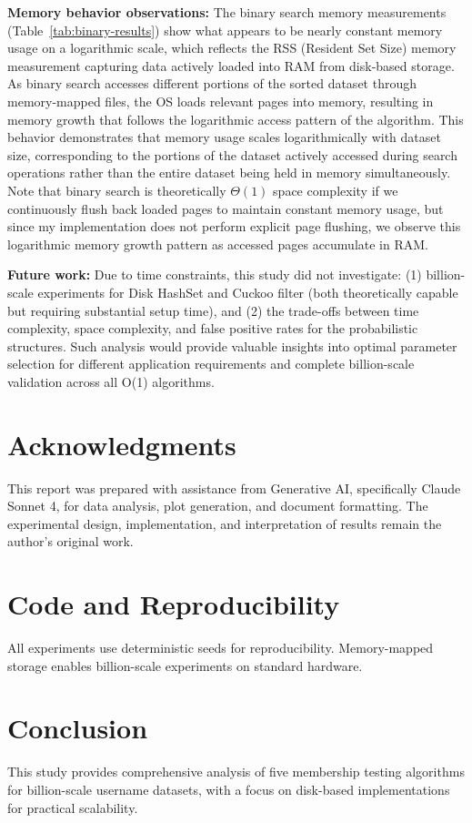 \documentclass[sigconf]{acmart}
\begin{document}
\textbf{Memory behavior observations:} The binary search memory measurements (Table~\ref{tab:binary-results}) show what appears to be nearly constant memory usage on a logarithmic scale, which reflects the RSS (Resident Set Size) memory measurement capturing data actively loaded into RAM from disk-based storage. As binary search accesses different portions of the sorted dataset through memory-mapped files, the OS loads relevant pages into memory, resulting in memory growth that follows the logarithmic access pattern of the algorithm. This behavior demonstrates that memory usage scales logarithmically with dataset size, corresponding to the portions of the dataset actively accessed during search operations rather than the entire dataset being held in memory simultaneously. Note that binary search is theoretically $\Theta(1)$ space complexity if we continuously flush back loaded pages to maintain constant memory usage, but since my implementation does not perform explicit page flushing, we observe this logarithmic memory growth pattern as accessed pages accumulate in RAM.

\textbf{Future work:} Due to time constraints, this study did not investigate: (1) billion-scale experiments for Disk HashSet and Cuckoo filter (both theoretically capable but requiring substantial setup time), and (2) the trade-offs between time complexity, space complexity, and false positive rates for the probabilistic structures. Such analysis would provide valuable insights into optimal parameter selection for different application requirements and complete billion-scale validation across all O(1) algorithms.

\section{Acknowledgments}
This report was prepared with assistance from Generative AI, specifically Claude Sonnet 4, for data analysis, plot generation, and document formatting. The experimental design, implementation, and interpretation of results remain the author's original work.

\section{Code and Reproducibility}
All experiments use deterministic seeds for reproducibility. Memory-mapped storage enables billion-scale experiments on standard hardware.

\section{Conclusion}
This study provides comprehensive analysis of five membership testing algorithms for billion-scale username datasets, with a focus on disk-based implementations for practical scalability.
\end{document}
